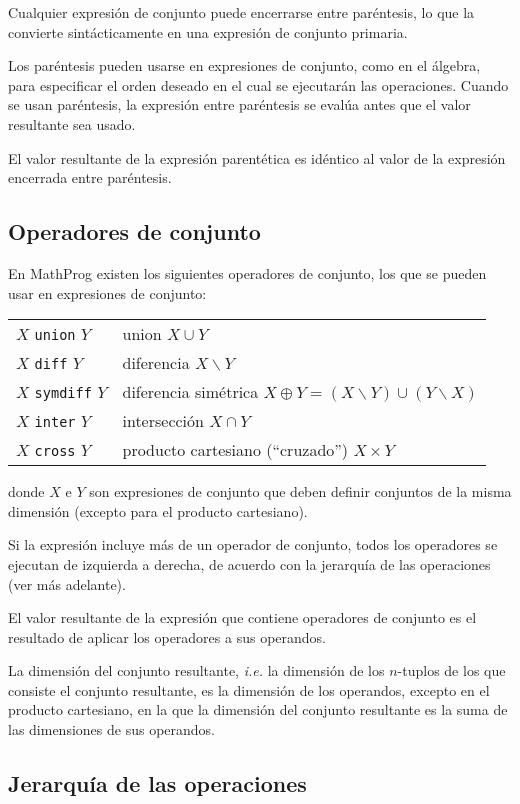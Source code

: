 \documentclass[11pt,spanish]{report}
\begin{document}
Cualquier expresión de conjunto puede encerrarse entre paréntesis, lo que la convierte sintácticamente en una expresión de conjunto primaria.

Los paréntesis pueden usarse en expresiones de conjunto, como en el álgebra, para especificar el orden deseado en el cual se ejecutarán las operaciones. Cuando se usan paréntesis, la expresión entre paréntesis se evalúa antes que el valor resultante sea usado.

El valor resultante de la expresión parentética es idéntico al valor de la expresión encerrada entre paréntesis.

\subsection{Operadores de conjunto}

En MathProg existen los siguientes operadores de conjunto, los que se pueden usar en expresiones de conjunto:

\begin{tabular}{@{}ll@{}}
$X$ {\tt union} $Y$&union $X\cup Y$\\
$X$ {\tt diff} $Y$&diferencia $X\backslash Y$\\
$X$ {\tt symdiff} $Y$&diferencia simétrica $X\oplus Y=(X\backslash Y)\cup(Y\backslash X)$\\
$X$ {\tt inter} $Y$&intersección $X\cap Y$\\
$X$ {\tt cross} $Y$&producto cartesiano (``cruzado'') $X\times Y$\\
\end{tabular}

\noindent donde $X$ e $Y$ son expresiones de conjunto que deben definir conjuntos de la misma dimensión (excepto para el producto cartesiano).

Si la expresión incluye más de un operador de conjunto, todos los operadores se ejecutan de izquierda a derecha, de acuerdo con la jerarquía de las operaciones (ver más adelante).

El valor resultante de la expresión que contiene operadores de conjunto es el resultado de aplicar los operadores a sus operandos.

La dimensión del conjunto resultante, {\it i.e.} la dimensión de los $n$-tuplos de los que consiste el conjunto resultante, es la dimensión de los operandos, excepto en el producto cartesiano, en la que la dimensión del conjunto resultante es la suma de las dimensiones de sus operandos.

\subsection{Jerarquía de las operaciones}
\end{document}
